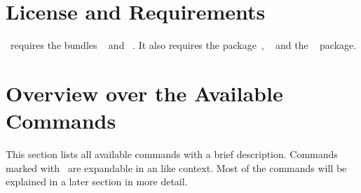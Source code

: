 \documentclass[load-preamble+,ngerman,british,american]{cnltx-doc}
\begin{document}

\section{License and Requirements}\label{sec:license-requirements}
\license

\chemnum\ requires the bundles ~\cite{bnd:l3kernel} and
~\cite{bnd:l3packages}.  It also requires the
 package~\cite{pkg:translations},
~\cite{pkg:chemgreek} and the ~\cite{pkg:psfrag}
package.

\section{Overview over the Available Commands}\label{sec:overv-over-avail}

This section lists all available commands with a brief description.  Commands
marked with \expandablesymbol\ are expandable in an  like context.
Most of the commands will be explained in a later section in more detail.
\end{document}
